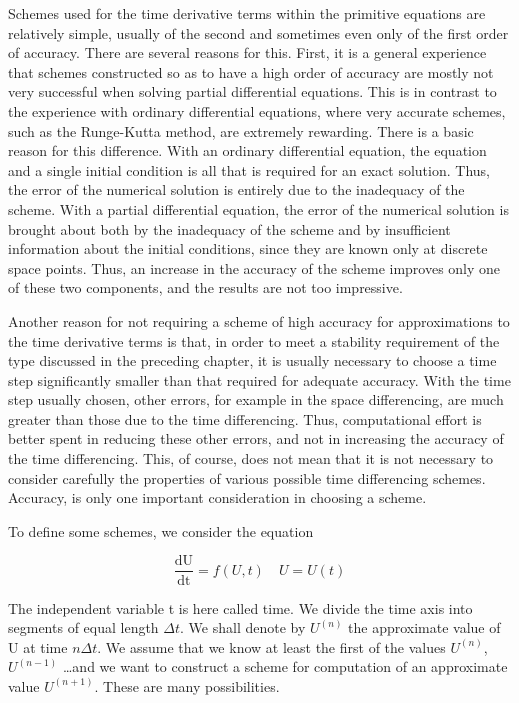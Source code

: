 Schemes used for the time derivative terms within the primitive
equations are relatively simple, usually of the second and sometimes
even only of the first order of accuracy. There are several reasons for
this. First, it is a general experience that schemes
constructed so as to have a high order of accuracy are mostly not very
successful when solving partial differential equations. This is in
contrast to the experience with ordinary differential equations, where
very accurate schemes, such as the Runge-Kutta method, are extremely
rewarding. There is a basic reason for this difference. With an
ordinary differential equation, the equation and a single initial
condition is all that is required for an exact solution. Thus, the error
of the numerical solution is entirely due to the inadequacy of the
scheme. With a partial differential equation, the error of the numerical
solution is brought about both by the inadequacy of the scheme and by
insufficient information about the initial conditions, since they are
known only at discrete space points. Thus, an increase in the accuracy
of the scheme improves only one of these two components, and the results
are not too impressive.

Another reason for not requiring a scheme of high accuracy for
approximations to the time derivative terms is that, in order to meet a
stability requirement of the type discussed in the preceding chapter, it
is usually necessary to choose a time step significantly smaller than
that required for adequate accuracy. With the time step usually chosen,
other errors, for example in the space differencing, are much greater
than those due to the time differencing. Thus, computational effort is
better spent in reducing these other errors, and not in increasing the
accuracy of the time differencing. This, of course, does not mean that
it is not necessary to consider carefully the properties of various
possible time differencing schemes. Accuracy, is only one important
consideration in choosing a scheme.

To define some schemes, we consider the equation

\[\frac{\text{dU}}{\text{dt}} = f( U,t) \quad  U = U(t)\]

The independent variable t is here called time. We divide the time axis
into segments of equal length \(\Delta t\). We shall denote by
\(U^{\left( n \right)}\) the approximate value of U at time
\(n\Delta t\). We assume that we know at least the first of the values
\(U^{\left( n \right)}\), \(U^{\left( n - 1 \right)}\) \ldots and we want
to construct a scheme for computation of an approximate value
\(U^{\left( n + 1 \right)}\). These are many possibilities.

